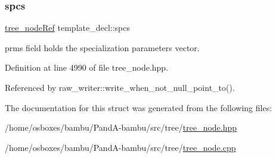 \mbox{\label{structtemplate__decl_a36780d7c998921187dd07c55f19d6f28}} 
\subsubsection{\texorpdfstring{spcs}{spcs}}
{\footnotesize\ttfamily \hyperlink{tree__node_8hpp_a6ee377554d1c4871ad66a337eaa67fd5}{tree\+\_\+node\+Ref} template\+\_\+decl\+::spcs}



prms field holds the specialization parameters vector. 



Definition at line 4990 of file tree\+\_\+node.\+hpp.



Referenced by raw\+\_\+writer\+::write\+\_\+when\+\_\+not\+\_\+null\+\_\+point\+\_\+to().



The documentation for this struct was generated from the following files\+:\begin{DoxyCompactItemize}
\item 
/home/osboxes/bambu/\+Pand\+A-\/bambu/src/tree/\hyperlink{tree__node_8hpp}{tree\+\_\+node.\+hpp}\item 
/home/osboxes/bambu/\+Pand\+A-\/bambu/src/tree/\hyperlink{tree__node_8cpp}{tree\+\_\+node.\+cpp}\end{DoxyCompactItemize}
